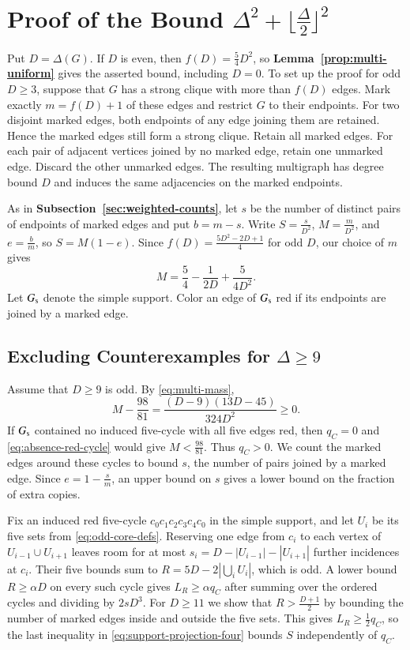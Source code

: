 \section{Proof of the Bound \texorpdfstring{$\Delta^2+\lfloor\frac{\Delta}{2}\rfloor^2$}{Delta squared plus floor(Delta/2) squared}}\label{sec:exact}\label{sec:multi-odd}

Put $D=\Delta(G)$. If $D$ is even, then $f(D)=\frac{5}{4}D^2$, so
\textbf{Lemma~\ref{prop:multi-uniform}} gives the asserted bound,
including $D=0$. To set up the proof for odd $D\geq3$, suppose that
$G$ has a strong clique with more than $f(D)$ edges. Mark
exactly $m=f(D)+1$ of these edges and restrict $G$ to their endpoints.
For two disjoint marked edges, both endpoints of any edge joining them
are retained. Hence the marked edges still form a strong clique.
Retain all marked edges. For each pair of adjacent vertices joined by
no marked edge, retain one unmarked edge. Discard the other unmarked
edges. The resulting multigraph has degree bound $D$ and induces the
same adjacencies on the marked endpoints.

As in \textbf{Subsection~\ref{sec:weighted-counts}}, let $s$ be the
number of distinct pairs of endpoints of marked edges and put $b=m-s$. Write
$S=\frac{s}{D^2}$, $M=\frac{m}{D^2}$, and $e=\frac{b}{m}$, so
$S=M(1-e)$. Since $f(D)=\frac{5D^2-2D+1}{4}$ for odd $D$, our
choice of $m$ gives
\begin{equation}\label{eq:multi-mass}
 M=\frac{5}{4}-\frac{1}{2D}+\frac{5}{4D^2}.
\end{equation}
Let $G_{\rm s}$ denote the simple support. Color an edge of $G_{\rm s}$
red if its endpoints are joined by a marked edge.

\subsection{Excluding Counterexamples for \texorpdfstring{$\Delta\geq9$}{Delta >= 9}}\label{subsec:exact-large-degree}

Assume that $D\geq9$ is odd. By \eqref{eq:multi-mass},
\[
 M-\frac{98}{81}=\frac{(D-9)(13D-45)}{324D^2}\geq0.
\]
If $G_{\rm s}$ contained no induced five-cycle with all five edges red,
then $q_C=0$ and \eqref{eq:absence-red-cycle} would give $M<\frac{98}{81}$.
Thus $q_C>0$. We count the marked edges around these cycles to bound
$s$, the number of pairs joined by a marked edge. Since $e=1-\frac{s}{m}$,
an upper bound on $s$ gives a lower bound on the fraction of extra copies.

Fix an induced red five-cycle $c_0c_1c_2c_3c_4c_0$ in the simple
support, and let $U_i$ be its five sets from \eqref{eq:odd-core-defs}.
Reserving one edge from $c_i$ to each vertex
of $U_{i-1}\cup U_{i+1}$ leaves room for at most
$s_i=D-|U_{i-1}|-|U_{i+1}|$ further incidences at $c_i$. Their five
bounds sum to $R=5D-2|\bigcup_i U_i|$, which is odd. A lower bound
$R\geq\alpha D$ on every such cycle
gives $L_R\geq\alpha q_C$ after summing over the ordered cycles and
dividing by $2sD^3$. For $D\geq11$ we show that $R>\frac{D+1}{2}$
by bounding the number of marked edges inside and outside the five
sets. This gives $L_R\geq\frac12 q_C$, so the last inequality in
\eqref{eq:support-projection-four} bounds $S$ independently of $q_C$.

